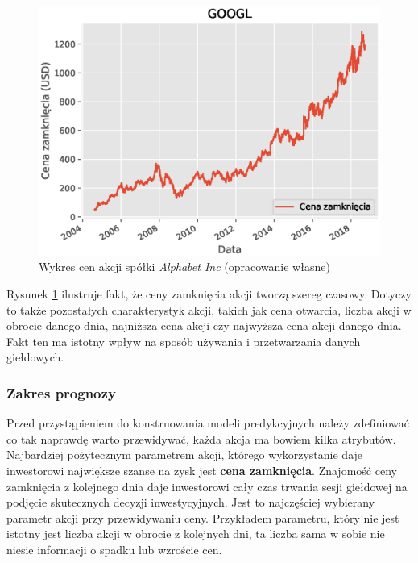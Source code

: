 \documentclass[a4paper, twoside, 11pt, openright]{article}
\begin{document}
\begin{figure}[H]
\centering \includegraphics[scale=0.9]{img/linear_regression/l_r_stock_data}
\caption{Wykres cen akcji spółki \textit{Alphabet Inc} (opracowanie własne)}
\label{alphabet_history}
\end{figure}

Rysunek \ref{alphabet_history} ilustruje fakt, że ceny zamknięcia akcji tworzą szereg czasowy. Dotyczy to także pozostałych charakterystyk akcji, takich jak cena otwarcia, liczba akcji w obrocie danego dnia, najniższa cena akcji czy najwyższa cena akcji danego dnia. Fakt ten ma istotny wpływ na sposób używania i przetwarzania danych giełdowych.

\subsubsection{Zakres prognozy}

Przed przystąpieniem do konstruowania modeli predykcyjnych należy zdefiniować co tak naprawdę warto przewidywać, każda akcja ma bowiem kilka atrybutów. Najbardziej pożytecznym parametrem akcji, którego wykorzystanie daje inwestorowi największe szanse na zysk jest \textbf{cena zamknięcia}. Znajomość ceny zamknięcia z kolejnego dnia daje inwestorowi cały czas trwania sesji giełdowej na podjęcie skutecznych decyzji inwestycyjnych. Jest to najczęściej wybierany parametr akcji przy przewidywaniu ceny. Przykładem parametru, który nie jest istotny jest liczba akcji w obrocie z kolejnych dni, ta liczba sama w sobie nie niesie informacji o spadku lub wzroście cen.

\bigskip
\end{document}

